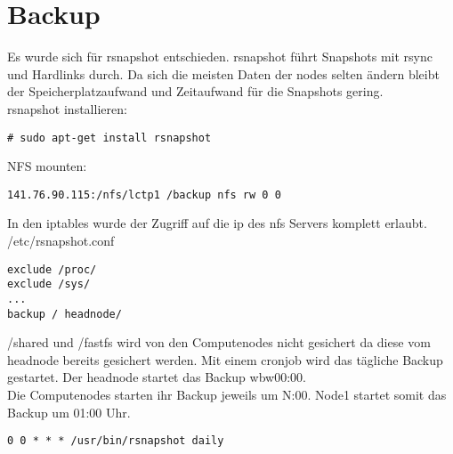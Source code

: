 \chapter{Backup}
Es wurde sich für rsnapshot entschieden. rsnapshot führt Snapshots mit rsync und Hardlinks durch.
Da sich die meisten Daten der nodes selten ändern bleibt der Speicherplatzaufwand und Zeitaufwand für die Snapshots gering.\\
rsnapshot installieren:
\begin{lstlisting}[style=Bash]
# sudo apt-get install rsnapshot
\end{lstlisting}
NFS mounten:
\begin{lstlisting}[style=Bash]
141.76.90.115:/nfs/lctp1 /backup nfs rw 0 0 
\end{lstlisting}
In den iptables wurde der Zugriff auf die ip des nfs Servers komplett erlaubt.
/etc/rsnapshot.conf
\begin{lstlisting}[style=Bash]
exclude /proc/
exclude /sys/
...
backup / headnode/
\end{lstlisting}
/shared und /fastfs wird von den Computenodes nicht gesichert da diese vom headnode bereits gesichert werden.
Mit einem cronjob wird das tägliche Backup gestartet. Der headnode startet das Backup wbw00:00. \\
Die Computenodes starten ihr Backup jeweils um N:00. Node1 startet somit das Backup um 01:00 Uhr.
\begin{lstlisting}[style=Bash]
0 0 * * * /usr/bin/rsnapshot daily
\end{lstlisting}
